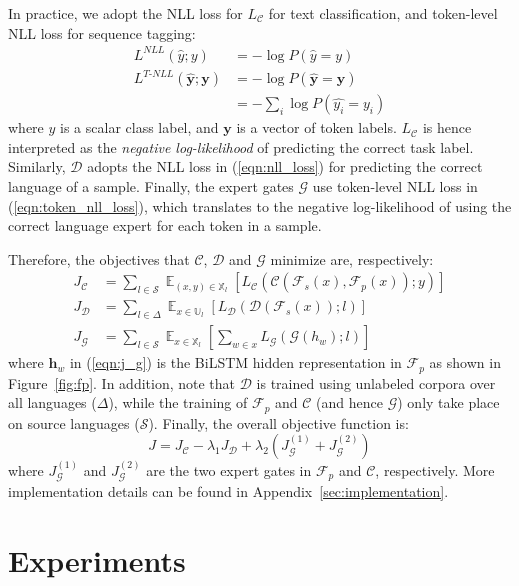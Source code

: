 \documentclass[11pt,a4paper]{article}
\def\vh{{\bm{h}}}
\def\vy{{\bm{y}}}
\def\gC{{\mathcal{C}}}
\def\gD{{\mathcal{D}}}
\def\gF{{\mathcal{F}}}
\def\gG{{\mathcal{G}}}
\def\gS{{\mathcal{S}}}
\def\sU{{\mathbb{U}}}
\def\sX{{\mathbb{X}}}
\newcommand{\expe}{\mathop{{}\mathbb{E}}}
\begin{document}
In practice, we adopt the NLL loss for $L_\gC$ for text classification, and token-level NLL loss for sequence tagging:
\begin{align}
L^{NLL}(\hat{y}; y) &= -\log P(\hat{y}=y) \label{eqn:nll_loss}\\
L^{T\text{-}NLL}(\hat{\vy}; \vy) &= -\log P(\hat{\vy} = \vy) \nonumber\\
&= -\sum_i \log P(\hat{y_i}=y_i) \label{eqn:token_nll_loss}
\end{align}
where $y$ is a scalar class label, and $\vy$ is a vector of token labels.
$L_\gC$ is hence interpreted as the \emph{negative log-likelihood} of predicting the correct task label.
Similarly, $\gD$ adopts the NLL loss in (\ref{eqn:nll_loss}) for predicting the correct language of a sample.
Finally, the expert gates $\gG$ use token-level NLL loss in (\ref{eqn:token_nll_loss}), which translates to the negative log-likelihood of using the correct language expert for each token in a sample.

Therefore, the objectives that $\gC$, $\gD$ and $\gG$ minimize are, respectively:
\begin{align}
    J_\gC &= \sum_{l\in\gS} \expe_{(x,y)\in\sX_l} \left[ L_\gC\left(\gC(\gF_s(x), \gF_p(x)); y\right)\right] 
    \label{eqn:j_c}\\
    J_\gD &= \sum_{l\in\Delta} \expe_{x\in\sU_l} \left[ L_\gD(\gD(\gF_s(x)); l)\right]
    \label{eqn:j_d}\\
    J_\gG &= \sum_{l\in\gS} \expe_{x\in\sX_l} \left[\sum_{w\in x} L_\gG(\gG(h_w); l)\right]
    \label{eqn:j_g}
\end{align}
where $\vh_w$ in (\ref{eqn:j_g}) is the BiLSTM hidden representation in $\gF_p$ as shown in Figure~\ref{fig:fp}.
In addition, note that $\gD$ is trained using unlabeled corpora over all languages ($\Delta$), while the training of $\gF_p$ and $\gC$ (and hence $\gG$) only take place on source languages ($\gS$).
Finally, the overall objective function is:
\begin{equation}
    J = J_\gC - \lambda_1 J_\gD + \lambda_2 \left(J_\gG^{(1)} + J_\gG^{(2)}\right)
    \label{eqn:j}
\end{equation}
where $J_\gG^{(1)}$ and $J_\gG^{(2)}$ are the two expert gates in $\gF_p$ and $\gC$, respectively.
More implementation details can be found in Appendix~\ref{sec:implementation}. \section{Experiments}\label{sec:exp}
\end{document}
